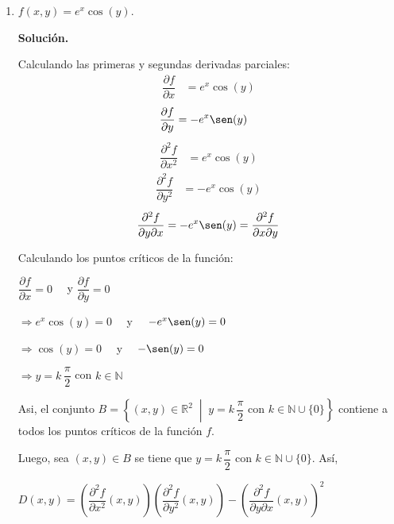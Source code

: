 \documentclass[fleqn, 12pt]{article}
\newcommand{\derivadaparcial}[2]{\dfrac{\partial {#1}}{\partial {#2}}}
\newcommand{\derivadaparcialn}[3]{\dfrac{\partial^{#3} {#1}}{\partial {#2}^{#3}}}
\newcommand{\derivadaparcialnd}[3]{\dfrac{\partial^{2} {#1}}{\partial {#3} \partial {#2}}}
\newcommand{\talque}{\; \middle | \;}
\begin{document}
\begin{enumerate}
\begin{enumerate}
            \item $ f(x,y) = e^x \cos (y) $.
            
            \textbf{Solución.}

            Calculando las primeras y segundas derivadas parciales:
            \begin{align*}
                \derivadaparcial{f}{x} &=  e^x \cos (y)
            \end{align*}
            \begin{align*}
                \derivadaparcial{f}{y} &=  -e^x \sen (y)
            \end{align*}
            \begin{align*}
                \derivadaparcialn{f}{x}{2} &= e^x \cos (y)
            \end{align*}
            \begin{align*}
                \derivadaparcialn{f}{y}{2} &= -e^x \cos (y)
            \end{align*}
            \begin{align}
                \derivadaparcialnd{f}{x}{y} = -e^x \sen (y) = \derivadaparcialnd{f}{y}{x}
            \end{align}
           
            Calculando los puntos críticos de la función:

            $ \derivadaparcial{f}{x} = 0 \quad $ y $ \derivadaparcial{f}{y} = 0 $

            $ \Longrightarrow e^x \cos (y) = 0 \quad $ y $ \quad -e^x \sen (y) = 0 $

            $ \Longrightarrow \cos (y) = 0 \quad $ y $ \quad - \sen (y) = 0 $

            $ \Longrightarrow y = k \, \dfrac{\pi}{2} $ con $ k \in \mathbb{N} $

            Asi, el conjunto $ B = \left\lbrace (x,y) \in \mathbb{R}^2 \talque y = k \, \dfrac{\pi}{2} \text{ con } k \in \mathbb{N} \cup \lbrace 0 \rbrace \right\rbrace $ contiene a todos los puntos críticos de la función $ f $.

            Luego, sea $ (x,y) \in B $ se tiene que $ y = k \, \dfrac{\pi}{2} \text{ con } k \in \mathbb{N} \cup \lbrace 0 \rbrace $. Así,

            $  D(x,y) = \left( \derivadaparcialn{f}{x}{2} (x,y) \right) \left( \derivadaparcialn{f}{y}{2} (x,y) \right) - \left( \derivadaparcialnd{f}{x}{y} (x,y) \right)^2 $


\end{enumerate}
\end{enumerate}
\end{document}
